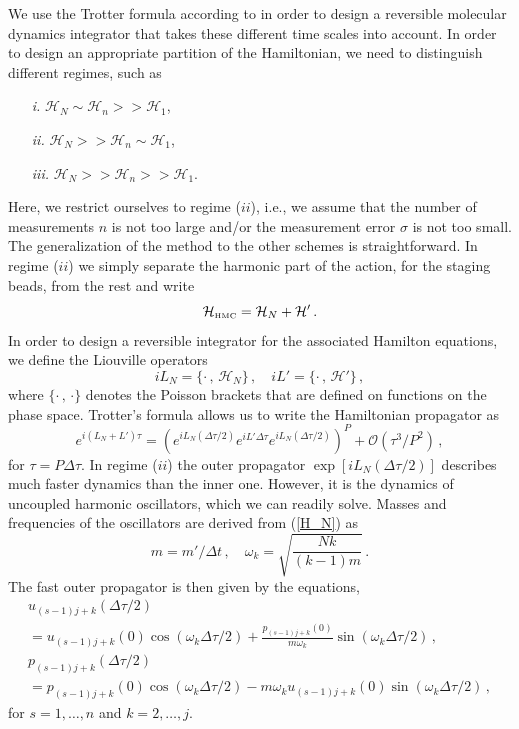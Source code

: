 \documentclass[12pt,a4paper,final]{iopart}
\begin{document}
We use the Trotter formula according to \cite{tuckerman_1992} in order to design a reversible molecular dynamics integrator that takes these different time scales into account.
In order to design an appropriate partition of the Hamiltonian, we need to distinguish different regimes, such as
\begin{enumerate}
  \item[\it i.]
  $\mathcal H_N \sim \mathcal H_n >> \mathcal H_1$,
  \item[\it ii.]
  $\mathcal H_N >> \mathcal H_n \sim \mathcal H_1$,
  \item[\it iii.]
  $\mathcal H_N >> \mathcal H_n >> \mathcal H_1$.
\end{enumerate}
Here, we restrict ourselves to regime ($ii$), i.e., we assume that the number of measurements $n$ is not too large and/or the measurement error $\sigma$ is not too small.
The generalization of the method to the other schemes is straightforward.
In regime ($ii$) we simply separate the harmonic part of the action, for the staging beads, from the rest and write
\begin{equation}
  \mathcal{H}_{\mbox{\tiny HMC}}=\mathcal H_N + \mathcal H'\,.
\end{equation}
In order to design a reversible integrator for the associated Hamilton equations, we define the Liouville operators
\begin{equation}
  iL_N=\{\cdot\,,\,\mathcal H_N\}\,,\quad
  iL'=\{\cdot\,,\,\mathcal H'\}\,,
\end{equation}
where $\{\cdot\,,\,\cdot\}$ denotes the Poisson brackets that are defined on functions on the phase space.
Trotter's formula \cite{trotter_1959} allows us to write the Hamiltonian propagator as
\begin{equation}\label{propagator}
  e^{i(L_N+L')\tau}
  =
  (e^{iL_N(\Delta\tau/2)}e^{iL'\Delta\tau}e^{iL_N(\Delta\tau/2)})^P
  +
  \mathcal O(\tau^3/P^{2})\,,
\end{equation}
for $\tau =P\Delta \tau$.
In regime ($ii$) the outer propagator $\exp[iL_N(\Delta \tau/2)]$ describes much faster dynamics than the inner one. However, it is the dynamics of uncoupled harmonic oscillators, which we can readily solve.
Masses and frequencies of the oscillators are derived from (\ref{H_N}) as
\begin{equation}
  m=m'/\Delta t\,,\quad
  \omega_k=\sqrt{\frac{Nk}{(k-1)m}}\,.
\end{equation}
The fast outer propagator is then given by the equations,
\begin{eqnarray}
  u_{(s-1)j+k}(\Delta\tau/2) \nonumber \\
  = u_{(s-1)j+k}(0)\cos(\omega_k\Delta\tau/2)
  +
  \frac{p_{(s-1)j+k}(0)}{m\omega_k}\sin(\omega_k\Delta\tau/2)\,,\\
  p_{(s-1)j+k}(\Delta\tau/2) \nonumber \\
  = p_{(s-1)j+k}(0)\cos(\omega_k\Delta\tau/2)
  -
  m\omega_k u_{(s-1)j+k}(0) \sin(\omega_k\Delta\tau/2)\,,
\end{eqnarray}
for $s=1,\dots,n$ and $k=2,\dots,j$.
\end{document}
